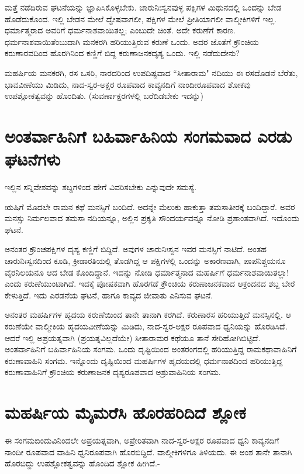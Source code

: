 ಮತ್ತೆ ನಡೆದಿರುವ ಘಟನೆಯನ್ನು ಜ್ಞಾಪಿಸಿಕೊಳ್ಳಬೇಕು. ಚಾರುನಿಃಸ್ವನವುಳ್ಳ ಪಕ್ಷಿಗಳ ಮಿಥುನದಲ್ಲಿ ಒಂದನ್ನು ಬೇಡ ಹೊಡೆದುಕೊಂದ. ಇಲ್ಲಿ ಬೇಡನ ಮೇಲೆ ದ್ವೇಷವಾಗಲೀ, ಪಕ್ಷಿಗಳ ಮೇಲೆ ಪ್ರೀತಿಯಾಗಲೀ ವಾಲ್ಮೀಕಿಗಳಿಗೆ ಇಲ್ಲ. ಧರ್ಮಾತ್ಮರಾದ ಅವರಿಗೆ ಧರ್ಮನಾಶವಾಯಿತಲ್ಲ; ಎಂಬುದೇ ಚಿಂತೆ. ಅದೇ ಕರುಣೆಗೆ ಕಾರಣ. ಧರ್ಮನಾಶವಾಯಿತೆಂಬುದಾಗಿ ಮನಕರಗಿ ಹರಿಯುತ್ತಿರುವ ಕರುಣೆ ಒಂದು. ಅದರ ಜೊತೆಗೆ ಕ್ರೌಂಚಿಯ ಕರುಣಾರವದಿಂದ ಹೊರಗಿನಿಂದ ಕಣ್ಣಿಗೆ ಬಿದ್ದ ಕರುಣಾಜನಕದೃಶ್ಯ ಒಂದು. ಇಲ್ಲಿ ನಡೆದುದೇನು? 

ಮಹರ್ಷಿಯ ಮನಕರಗಿ, ರಸ ಒಸರಿ, ನಾರದರಿಂದ ಉಪದಿಷ್ಟವಾದ ``ಸೀತಾರಾಮ" ನದಿಯು ಈ ರಸದೊಡನೆ ಬೆರೆತು, ಭಾವವೀಣೆಯು ಮಿಡಿದು, ನಾದ-ಸ್ವರ-ಅಕ್ಷರ ರೂಪವಾದ ಕಾವ್ಯನದಿಗೆ ನಾಂದೀರೂಪವಾದ ಶೋಕವು ಉಪಶ್ಲೋಕತ್ವವನ್ನು ಹೊಂದಿತು. (ಸುವರ್ಣಾಕ್ಷರಗಳಲ್ಲಿ ಬರೆದಿಡಬೇಕು ಇದನ್ನು) 

\section*{ಅಂತರ್ವಾಹಿನಿಗೆ ಬಹಿರ್ವಾಹಿನಿಯ ಸಂಗಮವಾದ ಎರಡು ಘಟನೆಗಳು} 

ಇಲ್ಲಿನ ಸನ್ನಿವೇಶವನ್ನು ಶಬ್ದಗಳಿಂದ ಹೇಗೆ ವಿವರಿಸಬೇಕು ಎನ್ನುವುದೇ ಸಮಸ್ಯೆ. 

ಋಷಿಗೆ ಮೊದಲೇ ರಾಮನ ಕಥೆ ಮನಸ್ಸಿಗೆ ಬಂದಿದೆ. ಅದನ್ನೇ ಮೆಲುಕು ಹಾಕುತ್ತಾ ತಮಸಾತೀರಕ್ಕೆ ಬಂದಿದ್ದಾರೆ. ಅವರ ಮನಸ್ಸು ನಿರ್ಮಲವಾದ ತಮಸಾ ನದಿಯನ್ನೂ, ಅಲ್ಲಿನ ಪ್ರಕೃತಿ ಸೌಂದರ್ಯವನ್ನೂ ನೋಡಿ ಪ್ರಶಾಂತವಾಗಿದೆ. ಇದೊಂದು ಘಟನೆ. 

ಅನಂತರ ಕ್ರೌಂಚಪಕ್ಷಿಗಳ ದೃಶ್ಯ ಕಣ್ಣಿಗೆ ಬಿದ್ದಿದೆ. ಅವುಗಳ ಚಾರುನಿಃಸ್ವನ ಇವರ ಮನಸ್ಸಿಗೆ ನಾಟಿದೆ. ಅಂತಹ ಚಾರುನಿಃಸ್ವನದಿಂದ ಕೂಡಿ, ಕ್ರೀಡಾರತಿಯಲ್ಲಿ ತೊಡಗಿದ್ದ ಆ ಪಕ್ಷಿಗಳಲ್ಲಿ ಒಂದನ್ನು ಅಕಾರಣವಾಗಿ, ಪಾಪನಿಶ್ಚಯನೂ ವೈರನಿಲಯನೂ ಆದ ಬೇಡ ಕೊಂದಿದ್ದಾನೆ. ಇದನ್ನು ನೋಡಿ ಧರ್ಮಾತ್ಮನಾದ ಮಹರ್ಷಿಗೆ ಧರ್ಮನಾಶವಾಯಿತಲ್ಲಾ! ಎಂದು ಕರುಣೆಯುಂಟಾಗಿದೆ. ಇದಕ್ಕೆ ಪೋಷಕವಾಗಿ ಹೊರಗಡೆ ಕ್ರೌಂಚಿಯ ಕರುಣಾಜನಕವಾದ ಆಕ್ರಂದನದ ಶಬ್ದ ಬೇರೆ ಕೇಳುತ್ತಿದೆ. ಇದು ಎರಡನೆಯ ಘಟನೆ, ಹಾಗೂ ಕಾವ್ಯದ ಜೀವಾತು ಎನಿಸುವ ಘಟನೆ. 

ಅನಂತರ ಮಹರ್ಷಿಗಳ ಹೃದಯ ಕರುಣೆಯಿಂದ ತಾನೇ ತಾನಾಗಿ ಕರಗಿದೆ. ಕರುಣಾರಸ ಹರಿಯುತ್ತಿದೆ ಮನಸ್ಸಿನಲ್ಲಿ. ಆ ಕರುಣೆಯೇ ವಾಲ್ಮೀಕಿಯ ಹೃದಯವೀಣೆಯನ್ನು ಮಿಡಿದು, ನಾದ-ಸ್ವರ-ಅಕ್ಷರ ರೂಪವಾದ ಧ್ವನಿಯನ್ನು ಹೊರಡಿಸಿದೆ. ಆದರೆ ಇಲ್ಲಿ ಅಪ್ರಯತ್ನವಾಗಿ (ಪ್ರಯತ್ನವಿಲ್ಲದೆಯೇ) ಸೀತಾರಾಮರ ಕಥೆಯೂ ತಾನೆ ಸೇರಿಹೋಗಿಬಿಟ್ಟಿದೆ. ಅಂತರ್ವಾಹಿನಿಗೆ ಬಹಿರ್ವಾಹಿನಿಯ ಸಂಗಮ. ಒಂದು ದೃಷ್ಟಿಯಿಂದ ಅಂತರಂಗದಲ್ಲಿ ಹರಿಯುತ್ತಿದ್ದ ರಾಮಕಥಾವಾಹಿನಿಗೆ ಕರುಣಾವಾಹಿನಿ ಸಂಗಮ. ಇನ್ನೊಂದು ದೃಷ್ಟಿಯಿಂದ ಮಹರ್ಷಿಗಳ ಹೃದಯದಲ್ಲಿ ಧರ್ಮನಾಶದಿಂದ ಹರಿಯುತ್ತಿದ್ದ ಕರುಣಾವಾಹಿನಿಗೆ ಕ್ರೌಂಚಿಯ ಕರುಣಾಜನಕ ದೃಶ್ಯರೂಪವಾದ ಅಶ್ರುವಾಹಿನಿಯ ಸಂಗಮ. 

\section*{ಮಹರ್ಷಿಯ ಮೈಮರೆಸಿ ಹೊರಹರಿದಿದೆ ಶ್ಲೋಕ} 

ಈ ಸಂಗಮಬಿಂದುವಿನಿಂದಲೇ ಅಪ್ರಯತ್ನವಾಗಿ, ಅಪ್ರೇರಿತವಾಗಿ ನಾದ-ಸ್ವರ-ಅಕ್ಷರ ರೂಪವಾದ ಧ್ವನಿ ಕಾವ್ಯನದಿಗೆ ನಾಂದೀ ರೂಪವಾದ ವಾಹಿನಿ ಧ್ವನಿರೂಪವಾಗಿ ಹೊರಬಿದ್ದಿದೆ. ವಾಲ್ಮೀಕಿಗಳಿಗೂ ತಿಳಿಯದು. ಈ ಅಂಶ ತಾನೇ ತಾನಾಗಿ ಹೊರಬಿದ್ದು ಉಪಶ್ಲೋಕತ್ವವನ್ನು ಹೊಂದಿದ ಶ್ಲೋಕ ಹೀಗಿದೆ.- 

